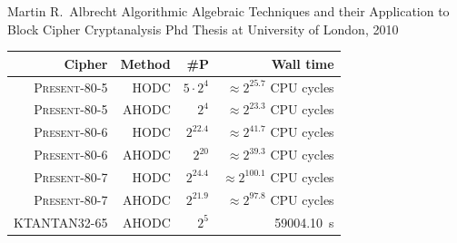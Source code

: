 \documentclass[9pt]{beamer}
\newcommand{\PRESENT}{\textsc{Present}\xspace}
\begin{document}
\begin{frame}[allowframebreaks]
\begin{thebibliography}{fooooo}
Martin R.~Albrecht
\newblock Algorithmic Algebraic Techniques and their Application to Block Cipher Cryptanalysis
\newblock Phd Thesis at University of London, 2010
\end{thebibliography}

\framebreak

\begin{table}[htbp]
\begin{center}
\begin{tabular}{|r|r|r|r|}
\hline
Cipher & Method & \#P & Wall time\\
\hline
\PRESENT-80-5 &  HODC & $5\cdot 2^4$ & $\approx 2^{25.7}$ CPU cycles\\
\PRESENT-80-5 & AHODC & $2^4$ & $\approx 2^{23.3}$  CPU cycles\\
\PRESENT-80-6 &  HODC & $2^{22.4}$ & $\approx 2^{41.7}$  CPU cycles\\
\PRESENT-80-6 & AHODC & $2^{20}$ & $\approx 2^{39.3}$  CPU cycles\\
\PRESENT-80-7 &  HODC & $2^{24.4}$ & $\approx 2^{100.1}$  CPU cycles\\
\PRESENT-80-7 & AHODC & $2^{21.9}$ & $\approx 2^{97.8}$  CPU cycles\\
\hline
KTANTAN32-65 & AHODC & $2^5$& 59004.10~s\\
\hline
\end{tabular}
\end{center}
\end{table}
\end{frame}
\end{document}
